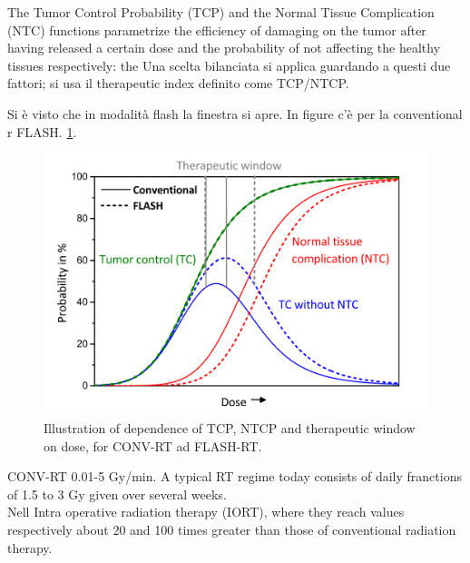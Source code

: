         The Tumor Control Probability (TCP) and the Normal Tissue Complication (NTC) functions parametrize the efficiency of damaging on the tumor after having released a certain dose and the probability of not affecting the healthy tissues respectively: the 
        Una scelta bilanciata si applica guardando a questi due fattori; si usa il therapeutic index definito come TCP/NTCP.

        
        Si è visto che in modalità flash la finestra si apre. 
        In figure c'è per la conventional r FLASH. \ref{fig:therapeutic_window}.
        \begin{figure}
            \centering
            \includegraphics[width=.8\linewidth]{figures/pixel_detectors_usage/curve_flash.png}
            \caption{Illustration of dependence of TCP, NTCP and therapeutic window on dose, for CONV-RT ad FLASH-RT.}
            \label{fig:therapeutic_window}
        \end{figure}
    

    CONV-RT 0.01-5 Gy/min. A typical RT regime today consists of daily franctions of 1.5 to 3 Gy given over several weeks.\\
    Nell Intra operative radiation therapy (IORT), where they reach values respectively about
    20 and 100 times greater than those of conventional radiation therapy.
    
